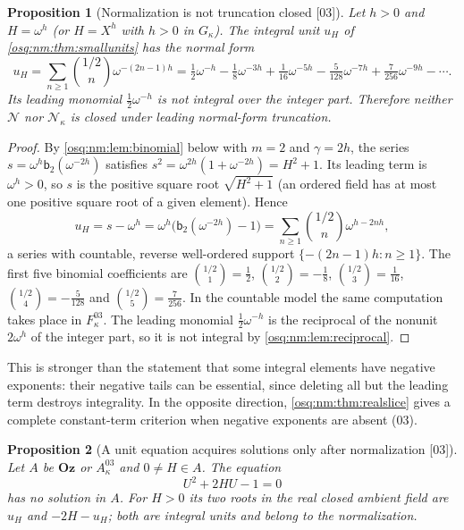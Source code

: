 \documentclass[11pt,letterpaper]{article}
\numberwithin{equation}{section}
\newtheorem{proposition}[proposition]{Proposition}
\theoremstyle{definition}
\theoremstyle{remark}
\theoremstyle{plain}
\newcommand{\Oz}{\mathbf{Oz}}
\newcommand{\NN}{\mathcal N}         %
\newcommand{\src}[1]{\textup{\textsf{[#1]}}}
\begin{document}
\begin{proposition}[Normalization is not truncation closed \src{03}]\label{osq:nm:prop:truncation}
Let $h>0$ and $H=\omega^h$ (or $H=X^h$ with $h>0$ in $G_\kappa$). The integral unit $u_H$
of \cref{osq:nm:thm:smallunits} has the normal form
\begin{equation}\label{osq:nm:eq:binomialunit}
 u_H=\sum_{n\ge1}\binom{1/2}{n}\omega^{-(2n-1)h}
 =\tfrac12\omega^{-h}-\tfrac18\omega^{-3h}+\tfrac1{16}\omega^{-5h}
 -\tfrac5{128}\omega^{-7h}+\tfrac7{256}\omega^{-9h}-\cdots .
\end{equation}
Its leading monomial $\frac12\omega^{-h}$ is not integral over the integer part.
Therefore neither $\NN$ nor $\NN_\kappa$ is closed under leading normal-form truncation.
\end{proposition}

\begin{proof}
By \cref{osq:nm:lem:binomial} below with $m=2$ and $\gamma=2h$, the series
$s=\omega^h\mathsf b_2(\omega^{-2h})$ satisfies $s^2=\omega^{2h}(1+\omega^{-2h})=H^2+1$.
Its leading term is $\omega^h>0$, so $s$ is the positive square root $\sqrt{H^2+1}$ (an
ordered field has at most one positive square root of a given element). Hence
\[
 u_H=s-\omega^h=\omega^h\bigl(\mathsf b_2(\omega^{-2h})-1\bigr)
 =\sum_{n\ge1}\binom{1/2}{n}\omega^{h-2nh},
\]
a series with countable, reverse well-ordered support $\{-(2n-1)h:n\ge1\}$. The first five
binomial coefficients are $\binom{1/2}{1}=\frac12$, $\binom{1/2}{2}=-\frac18$,
$\binom{1/2}{3}=\frac1{16}$, $\binom{1/2}{4}=-\frac5{128}$ and
$\binom{1/2}{5}=\frac7{256}$. In the countable model the same computation takes place in
$F^{03}_\kappa$. The leading monomial $\frac12\omega^{-h}$ is the reciprocal of the nonunit
$2\omega^h$ of the integer part, so it is not integral by \cref{osq:nm:lem:reciprocal}.
\end{proof}

This is stronger than the statement that some integral elements have negative exponents:
their negative tails can be essential, since deleting all but the leading term destroys
integrality. In the opposite direction, \cref{osq:nm:thm:realslice} gives a complete
constant-term criterion when negative exponents are absent (03).

\begin{proposition}[A unit equation acquires solutions only after normalization \src{03}]\label{osq:nm:prop:unitdioph}
Let $A$ be $\Oz$ or $A^{03}_\kappa$ and $0\ne H\in A$. The equation
\begin{equation}\label{osq:nm:eq:unitdioph}
 U^2+2HU-1=0
\end{equation}
has no solution in $A$. For $H>0$ its two roots in the real closed ambient field are
$u_H$ and $-2H-u_H$; both are integral units and belong to the normalization.
\end{proposition}
\end{document}
